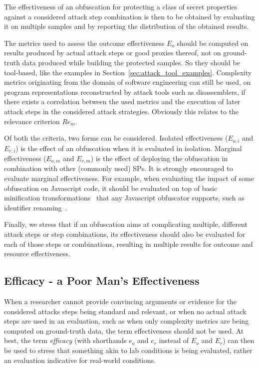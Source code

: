 \vspace{0.2cm}

The effectiveness of an obfuscation for protecting a class of secret properties against a considered attack step combination is then to be obtained by evaluating it on multiple samples and by reporting the distribution of the obtained results. 

The metrics used to assess the outcome effectiveness $E_o$ should be computed on results produced by actual attack steps or good proxies thereof, not on ground-truth data produced while building the protected samples. So they should be tool-based, like the examples in Section~\ref{sec:attack_tool_examples}. Complexity metrics originating from the domain of software engineering can still be used, on program representations reconstructed by attack tools such as disassemblers, if there exists a correlation between the used metrics and the execution of later attack steps in the considered attack strategies. Obviously this relates to the relevance criterion $Re_m$. 

Of both the criteria, two forms can be considered. Isolated effectiveness ($E_{o,i}$ and $E_{r,i}$) is the effect of an obfuscation when it is evaluated in isolation. Marginal effectiveness ($E_{o,m}$ and $E_{r,m}$) is the effect of deploying the obfuscation in combination with other (commonly used) SPs. It is strongly encouraged to evaluate marginal effectiveness. For example, when evaluating the impact of some obfuscation on Javascript code, it should be evaluated on top of basic minification transformations~\cite{2019_anything_to_hide_studying_minified_and_obfuscated_code_in_the_web} that any Javascript obfuscator supports, such as identifier renaming~\cite{liu2017stochastic}. 

Finally, we stress that if an obfuscation aims at complicating multiple, different attack steps or step combinations, its effectiveness should also be evaluated for each of those steps or combinations, resulting in multiple results for outcome and resource effectiveness. 

\subsection{Efficacy - a Poor Man's Effectiveness}
\label{sec:efficacy}
When a researcher cannot provide convincing arguments or evidence for the considered attacks steps being standard and relevant, or when no actual attack steps are used in an evaluation, such as when only complexity metrics are being computed on ground-truth data, the term effectiveness should not be used. At best, the term \emph{efficacy} (with shorthands $e_o$ and $e_r$ instead of $E_o$ and $E_r$) can then be used to stress that something akin to lab conditions is being evaluated, rather an evaluation indicative for real-world conditions. 

